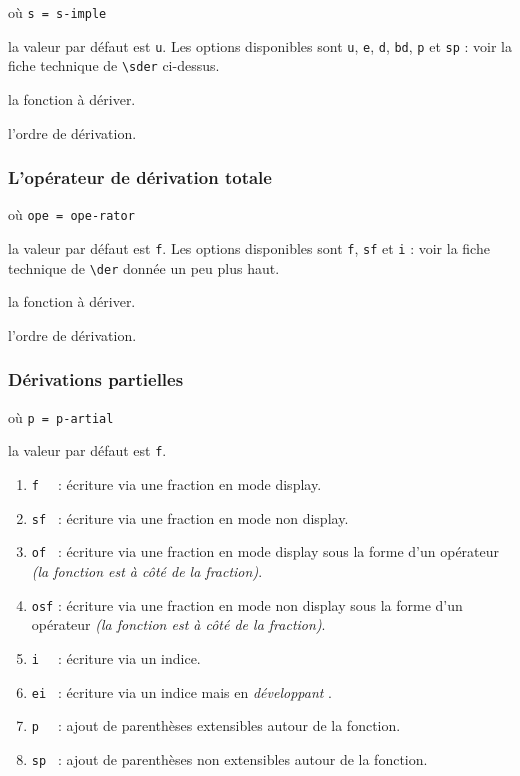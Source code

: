 \documentclass[12pt,a4paper]{article}
\newcommand\env[1]{\texttt{#1}}
\newcommand\macro[1]{\env{\textbackslash{}#1}}
\theoremstyle{definition}
\newcommand\mwhyprefix[2]{%
	\texttt{#1 = #1-#2}%
}
\begin{document}
 où \quad \mwhyprefix{s}{imple}

\IDoption{} la valeur par défaut est \verb+u+. Les options disponibles sont \verb+u+, \verb+e+, \verb+d+, \verb+bd+, \verb+p+ et \verb+sp+ : voir la fiche technique de \macro{sder} ci-dessus.

 la fonction à dériver.

 l'ordre de dérivation.




\subsubsection{L'opérateur de dérivation totale} \label{tnsana-ope-total-der}



 où \quad \mwhyprefix{ope}{rator}

\IDoption{} la valeur par défaut est \verb+f+. Les options disponibles sont \verb+f+, \verb+sf+ et \verb+i+ : voir la fiche technique de \macro{der} donnée un peu plus haut.

 la fonction à dériver.

 l'ordre de dérivation.


\subsubsection{Dérivations partielles}



 où \quad \mwhyprefix{p}{artial}

\IDoption{} la valeur par défaut est \verb+f+. 
\begin{enumerate}
	\item \verb+f  + : écriture via une fraction en mode display.

	\item \verb+sf + : écriture via une fraction en mode non display.

	\item \verb+of + : écriture via une fraction en mode display sous la forme d'un opérateur \emph{(la fonction est à côté de la fraction)}.

	\item \verb+osf+ : écriture via une fraction en mode non display sous la forme d'un opérateur \emph{(la fonction est à côté de la fraction)}.

	\medskip

	\item \verb+i  + : écriture via un indice.

	\item \verb+ei + : écriture via un indice mais en \emph{\og développant \fg}.

	\medskip

	\item \verb+p  + : ajout de parenthèses extensibles autour de la fonction.

	\item \verb+sp + : ajout de parenthèses non extensibles autour de la fonction.
\end{enumerate}
\end{document}

